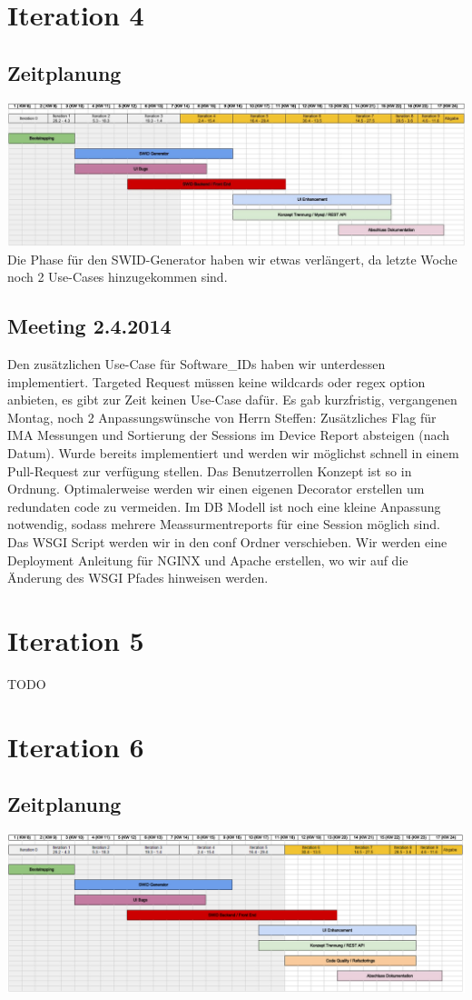 \section{Iteration 4}
\subsection{Zeitplanung}
\includegraphics[width=\textwidth]{images/zeitplanung/Iteration4.jpg}
Die Phase für den SWID-Generator haben wir etwas verlängert, da letzte Woche noch 2 Use-Cases hinzugekommen sind.
\subsection{Meeting 2.4.2014}
Den zusätzlichen Use-Case für Software\_IDs haben wir unterdessen implementiert. Targeted Request müssen keine wildcards oder regex option anbieten, es gibt zur Zeit keinen Use-Case dafür. Es gab kurzfristig, vergangenen Montag, noch 2 Anpassungswünsche von Herrn Steffen: Zusätzliches Flag für IMA Messungen und  Sortierung der Sessions im Device Report absteigen (nach Datum). Wurde bereits implementiert und werden wir möglichst schnell in einem Pull-Request zur verfügung stellen.
Das Benutzerrollen Konzept ist so in Ordnung. Optimalerweise werden wir einen eigenen Decorator erstellen um redundaten code zu vermeiden. Im DB Modell ist noch eine kleine Anpassung notwendig, sodass mehrere Meassurmentreports für eine Session möglich sind. Das WSGI Script werden wir in den conf Ordner verschieben. Wir werden eine Deployment Anleitung für NGINX und Apache erstellen, wo wir auf die Änderung des WSGI Pfades hinweisen werden. 

\section{Iteration 5}
TODO
\section{Iteration 6}

\subsection{Zeitplanung}
\includegraphics[width=\textwidth]{images/zeitplanung/Iteration6.jpg}

